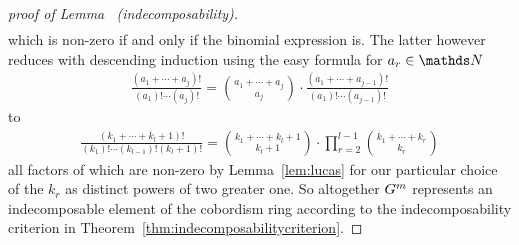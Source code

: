 \begin{proof}[proof of
  Lemma~
  (indecomposability)]
\begin{gather*}
  \end{gather*}
  which is non-zero if and only if the binomial expression is.
  The latter however reduces with descending induction using the
  easy formula for $a_r\in\Nat$
  \begin{gather*}
    \frac{(a_1+\dotsb+a_j)!}{(a_1)!\dotsm(a_j)!}
    = \binom{a_1+\dotsb+a_j}{a_j}
    \cdot \frac{(a_1+\dotsb+a_{j-1})!}{(a_1)!\dotsm(a_{j-1})!}
  \end{gather*}
  to
  \begin{gather*}
    \frac{(k_1+\dotsb+k_l+1)!}{(k_1)!\dotsm(k_{l-1})!(k_l+1)!}
    = \binom{k_1+\dotsb+k_l+1}{k_l+1}
    \cdot \prod_{r=2}^{l-1}\binom{k_1+\dotsb+k_r}{k_r}
  \end{gather*}
  all factors of which are non-zero by Lemma~\ref{lem:lucas} for
  our particular choice of the $k_r$ as distinct powers of two
  greater one.
  So altogether $G^{m}$ represents an indecomposable element of
  the cobordism ring according to the indecomposability criterion
  in Theorem~\ref{thm:indecomposabilitycriterion}.
  \qedhere
\end{proof}

